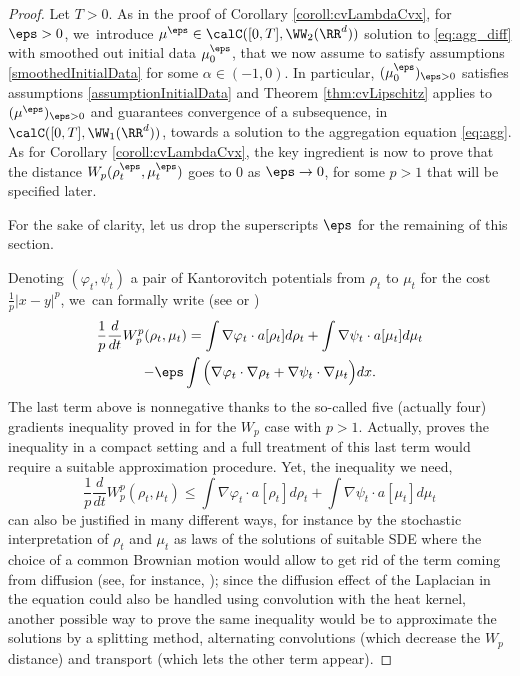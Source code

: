 \begin{proof}
Let $T>0$. As in the proof of Corollary \ref{coroll:cvLambdaCvx}, for $\eps > 0$, we~introduce $\mu^\eps \in \calC([0,T], \WW_2(\RR^d))$ solution to \eqref{eq:agg_diff} with smoothed out initial data $\mu_0^\eps$, that we now assume to satisfy assumptions \eqref{smoothedInitialData} for some $\alpha \in (-1,0)$. In particular, $(\mu_0^\eps)_{\eps > 0}$ satisfies assumptions \eqref{assumptionInitialData} and Theorem \ref{thm:cvLipschitz} applies to $(\mu^\eps)_{\eps>0}$ and guarantees convergence of a subsequence, in $\calC([0,T], \WW_1(\RR^d))$, towards a solution to the aggregation equation \eqref{eq:agg}. As for Corollary \ref{coroll:cvLambdaCvx}, the key ingredient is now to prove that the distance $W_p(\rho_t^\eps, \mu_t^\eps)$ goes to 0 as $\eps \to 0$, for some $p > 1$ that will be specified later.

For the sake of clarity, let us drop the superscripts $\eps$ for the remaining of this section.

Denoting $(\varphi_t, \psi_t)$ a pair of Kantorovitch potentials from $\rho_t$ to $\mu_t$ for the cost $\frac{1}{p}|x-y|^p$, we~can formally write (see \cite[Th.\,5.24]{otam15} or \cite[Th.\,8.4.7]{ambrosio08})
\begin{multline*}
\frac 1p \frac{d}{dt} W_p^p(\rho_t, \mu_t) = \int \nabla \varphi_t \cdot a[\rho_t] d\rho_t
+ \int \nabla \psi_t \cdot a[\mu_t] d\mu_t \\
- \eps \int \Big(\nabla \varphi_t \cdot \nabla \rho_t + \nabla \psi_t \cdot \nabla \mu_t \Big) dx.
\end{multline*}
The last term above is nonnegative thanks to the so-called five (actually four) gradients inequality proved in \cite{caillet21} for the $W_p$ case with $p>1$. Actually, \cite{caillet21} proves the inequality in a compact setting and a full treatment of this last term would require a suitable approximation procedure. Yet, the inequality we need, \ie
\[
\frac 1p \frac{d}{dt} W_p^p(\rho_t, \mu_t) \leq \int \nabla \varphi_t \cdot a[\rho_t] d\rho_t + \int \nabla \psi_t \cdot a[\mu_t] d\mu_t
\]
can also be justified in many different ways, for instance by the stochastic interpretation of $\rho_t$ and $\mu_t$ as laws of the solutions of suitable SDE where the choice of a common Brownian motion would allow to get rid of the term coming from diffusion (see, for instance, \cite{BolGenGui}); since the diffusion effect of the Laplacian in the equation could also be handled using convolution with the heat kernel, another possible way to prove the same inequality would be to approximate the solutions by a splitting method, alternating convolutions (which decrease the $W_p$ distance) and transport (which lets the other term appear).


\end{proof}
